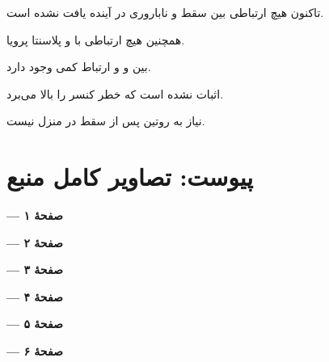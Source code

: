 \documentclass[12pt,a4paper]{article}
\begin{document}
تاکنون هیچ ارتباطی بین سقط و ناباروری در آینده یافت نشده است.

همچنین هیچ ارتباطی با  و پلاسنتا پرویا.

بین  و  و  ارتباط کمی وجود دارد.

اثبات نشده است که  خطر کنسر  را بالا می‌برد.

نیاز به  روتین پس از سقط در منزل نیست.

\clearpage
\section*{پیوست: تصاویر کامل منبع}
\begin{center}\textbf{ — صفحهٔ ۱}\par{}\end{center}
\clearpage
\begin{center}\textbf{ — صفحهٔ ۲}\par{}\end{center}
\clearpage
\begin{center}\textbf{ — صفحهٔ ۳}\par{}\end{center}
\clearpage
\begin{center}\textbf{ — صفحهٔ ۴}\par{}\end{center}
\clearpage
\begin{center}\textbf{ — صفحهٔ ۵}\par{}\end{center}
\clearpage
\begin{center}\textbf{ — صفحهٔ ۶}\par{}\end{center}
\Abortionfinish
\end{document}
